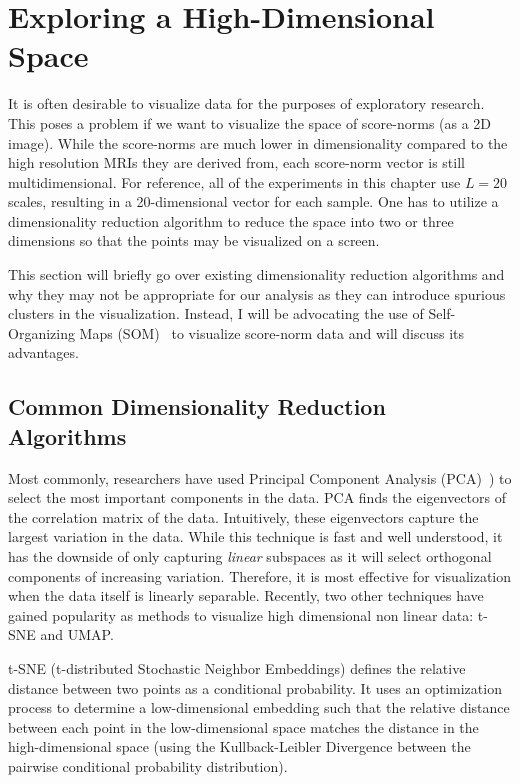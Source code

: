 \section{Exploring a High-Dimensional Space}

It is often desirable to visualize data for the purposes of exploratory research. This poses a problem if we want to visualize the space of score-norms (as a 2D image). While the score-norms are much lower in dimensionality compared to the high resolution MRIs they are derived from, each score-norm vector is still multidimensional. For reference, all of the experiments in this chapter use $L=20$ scales, resulting in a 20-dimensional vector for each sample. One has to utilize a dimensionality reduction algorithm to reduce the space into two or three dimensions so that the points may be visualized on a screen.

This section will briefly go over existing dimensionality reduction algorithms and why they may not be appropriate for our analysis as they can introduce spurious clusters in the visualization. Instead, I will be advocating the use of Self-Organizing Maps (SOM)~\cite{kohonen1990self} to visualize score-norm data and will discuss its advantages.


\subsection*{Common Dimensionality Reduction Algorithms}

Most commonly, researchers have used Principal Component Analysis (PCA)~\cite{abdi2010principal}) to select the most important components in the data. PCA finds the eigenvectors of the correlation matrix of the data. Intuitively, these eigenvectors capture the largest variation in the data. While this technique is fast and well understood, it has the downside of only capturing \textit{linear} subspaces as it will select orthogonal components of increasing variation. Therefore, it is most effective for visualization when the data itself is linearly separable. Recently, two other techniques have gained popularity as methods to visualize high dimensional non linear data: t-SNE and UMAP.  


t-SNE (t-distributed Stochastic Neighbor Embeddings) defines the relative distance between two points as a conditional probability. It uses an optimization process to determine a low-dimensional embedding such that the relative distance between each point in the low-dimensional space matches the distance in the high-dimensional space (using the Kullback-Leibler Divergence between the pairwise conditional probability distribution).

